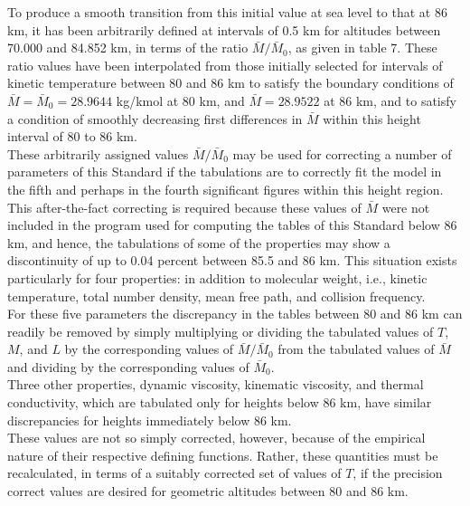 \documentclass{article}
\begin{document}
To produce a smooth transition from this initial value at sea level to that at 86 km, it has been arbitrarily defined at intervals of 0.5 km for altitudes between 70.000 and 84.852 km, in terms of the ratio $\bar{M} / \bar{M}_0$, as given in table 7. These ratio values have been interpolated from those initially selected for intervals of kinetic temperature between 80 and 86 km to satisfy the boundary conditions of $\bar{M} = \bar{M}_0 = 28.9644$ kg/kmol at 80 km, and $\bar{M} = 28.9522$ at 86 km, and to satisfy a condition of smoothly decreasing first differences in $\bar{M}$ within this height interval of 80 to 86 km.\\

These arbitrarily assigned values $\bar{M} / \bar{M}_0$ may be used for correcting a number of parameters of this Standard if the tabulations are to correctly fit the model in the fifth and perhaps in the fourth significant figures within this height region.\\

This after-the-fact correcting is required because these values of $\bar{M}$ were not included in the program used for computing the tables of this Standard below 86 km, and hence, the tabulations of some of the properties may show a discontinuity of up to 0.04 percent between 85.5 and 86 km. This situation exists particularly for four properties: in addition to molecular weight, i.e., kinetic temperature, total number density, mean free path, and collision frequency.\\

For these five parameters the discrepancy in the tables between 80 and 86 km can readily be removed by simply multiplying or dividing the tabulated values of $T$, $M$, and $L$ by the corresponding values of $\bar{M} / \bar{M}_0$ from the tabulated values of $\bar{M}$ and dividing by the corresponding values of $\bar{M}_0$.\\

Three other properties, dynamic viscosity, kinematic viscosity, and thermal conductivity, which are tabulated only for heights below 86 km, have similar discrepancies for heights immediately below 86 km.\\

These values are not so simply corrected, however, because of the empirical nature of their respective defining functions. Rather, these quantities must be recalculated, in terms of a suitably corrected set of values of $T$, if the precision correct values are desired for geometric altitudes between 80 and 86 km.\\
\end{document}
